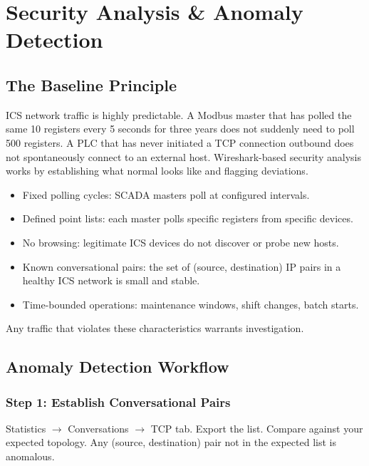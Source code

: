\documentclass[12pt,twoside,openright]{memoir}
\begin{document}
\chapter{Security Analysis \& Anomaly Detection}

\section{The Baseline Principle}

ICS network traffic is highly predictable. A Modbus master that has polled the same 10 registers every 5 seconds for three years does not suddenly need to poll 500 registers. A PLC that has never initiated a TCP connection outbound does not spontaneously connect to an external host. Wireshark-based security analysis works by establishing what normal looks like and flagging deviations.

\begin{keyconcept}[title={What Makes ICS Traffic Predictable}]
\begin{itemize}[noitemsep]
  \item Fixed polling cycles: SCADA masters poll at configured intervals.
  \item Defined point lists: each master polls specific registers from specific devices.
  \item No browsing: legitimate ICS devices do not discover or probe new hosts.
  \item Known conversational pairs: the set of (source, destination) IP pairs in a healthy ICS network is small and stable.
  \item Time-bounded operations: maintenance windows, shift changes, batch starts.
\end{itemize}
Any traffic that violates these characteristics warrants investigation.
\end{keyconcept}

\section{Anomaly Detection Workflow}

\subsection{Step 1: Establish Conversational Pairs}
Statistics $\to$ Conversations $\to$ TCP tab. Export the list. Compare against your expected topology. Any (source, destination) pair not in the expected list is anomalous.
\end{document}

